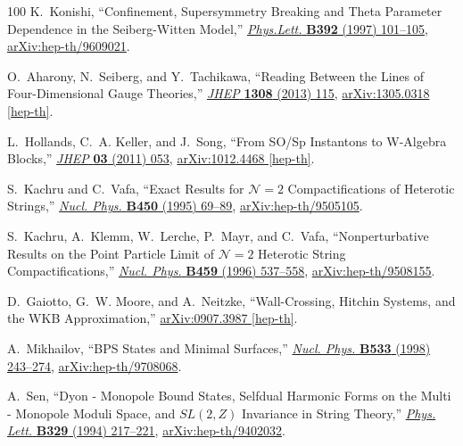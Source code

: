 \begin{thebibliography}{100}
K.~Konishi, ``{Confinement, Supersymmetry Breaking and Theta Parameter Dependence in the Seiberg-Witten Model},''
\href{http://dx.doi.org/10.1016/S0370-2693(96)01527-4}{{\em Phys.Lett.} {\bfseries B392} (1997) 101--105},
\href{http://arxiv.org/abs/hep-th/9609021}{{\ttfamily arXiv:hep-th/9609021}}.

O.~Aharony, N.~Seiberg, and Y.~Tachikawa, ``{Reading Between the Lines of Four-Dimensional Gauge Theories},''
\href{http://dx.doi.org/10.1007/JHEP08(2013)115}{{\em JHEP} {\bfseries 1308} (2013) 115},
\href{http://arxiv.org/abs/1305.0318}{{\ttfamily arXiv:1305.0318 [hep-th]}}.

L.~Hollands, C.~A. Keller, and J.~Song, ``{From SO/Sp Instantons to W-Algebra Blocks},''
\href{http://dx.doi.org/10.1007/JHEP03(2011)053}{{\em JHEP} {\bfseries 03} (2011) 053},
\href{http://arxiv.org/abs/1012.4468}{{\ttfamily arXiv:1012.4468 [hep-th]}}.

S.~Kachru and C.~Vafa, ``{Exact Results for ${\mathcal{N}}\!=2$ Compactifications of Heterotic Strings},''
\href{http://dx.doi.org/10.1016/0550-3213(95)00307-E}{{\em Nucl. Phys.} {\bfseries B450} (1995) 69--89},
\href{http://arxiv.org/abs/hep-th/9505105}{{\ttfamily arXiv:hep-th/9505105}}.

S.~Kachru, A.~Klemm, W.~Lerche, P.~Mayr, and C.~Vafa, ``{Nonperturbative Results on the Point Particle Limit of ${\mathcal{N}}\!=2$ Heterotic String Compactifications},''
\href{http://dx.doi.org/10.1016/0550-3213(95)00574-9}{{\em Nucl. Phys.} {\bfseries B459} (1996) 537--558},
\href{http://arxiv.org/abs/hep-th/9508155}{{\ttfamily arXiv:hep-th/9508155}}.

D.~Gaiotto, G.~W. Moore, and A.~Neitzke, ``{Wall-Crossing, Hitchin Systems, and the WKB Approximation},''
\href{http://arxiv.org/abs/0907.3987}{{\ttfamily arXiv:0907.3987 [hep-th]}}.

A.~Mikhailov, ``{BPS States and Minimal Surfaces},''
\href{http://dx.doi.org/10.1016/S0550-3213(98)00524-0}{{\em Nucl. Phys.} {\bfseries B533} (1998) 243--274},
\href{http://arxiv.org/abs/hep-th/9708068}{{\ttfamily arXiv:hep-th/9708068}}.

A.~Sen, ``{Dyon - Monopole Bound States, Selfdual Harmonic Forms on the Multi - Monopole Moduli Space, and $SL(2,Z)$ Invariance in String Theory},''
\href{http://dx.doi.org/10.1016/0370-2693(94)90763-3}{{\em Phys. Lett.} {\bfseries B329} (1994) 217--221},
\href{http://arxiv.org/abs/hep-th/9402032}{{\ttfamily arXiv:hep-th/9402032}}.


\end{thebibliography}
